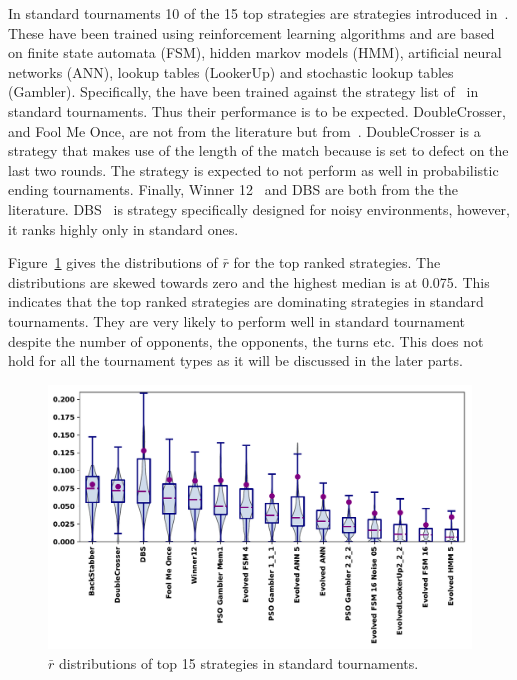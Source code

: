 \documentclass{article}
\begin{document}
In standard tournaments 10 of the 15 top strategies are strategies introduced
in~\cite{Harper2017}. These have been trained using reinforcement learning
algorithms and are based on finite state automata (FSM), hidden markov models
(HMM), artificial neural networks (ANN), lookup tables (LookerUp) and stochastic
lookup tables (Gambler). Specifically, the have been trained against the
strategy list of~\cite{axelrodproject} in standard tournaments. Thus their
performance is to be expected. DoubleCrosser, and Fool Me Once, are not from the
literature but from~\cite{axelrodproject}. DoubleCrosser is a strategy that
makes use of the length of the match because is set to defect on the last two
rounds. The strategy is expected to not perform as well in probabilistic ending
tournaments. Finally, Winner 12~\cite{mathieu2017} and DBS are both from the the
literature. DBS~\cite{Au2006} is strategy specifically designed for noisy
environments, however, it ranks highly only in standard ones.

Figure~\ref{fig:std_results} gives the distributions of $\bar{r}$ for the top
ranked strategies. The distributions are skewed towards zero and the highest
median is at 0.075. This indicates that the top ranked strategies are dominating
strategies in standard tournaments. They are very likely to perform well in
standard tournament despite the number of opponents, the opponents, the turns
etc. This does not hold for all the tournament types as it will be discussed
in the later parts.

\begin{figure}[!htbp]
    \centering
    \includegraphics[width=.7\textwidth]{../images/performance_standard.pdf}
    \caption{$\bar{r}$ distributions of top 15 strategies in standard tournaments.}\label{fig:std_results}
\end{figure}
\end{document}
